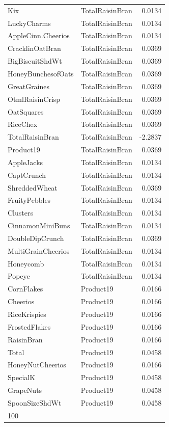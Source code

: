 \begin{longtable}{llr}
Kix & TotalRaisinBran & 0.0134 \\
LuckyCharms & TotalRaisinBran & 0.0134 \\
AppleCinn.Cheerios & TotalRaisinBran & 0.0134 \\
CracklinOatBran & TotalRaisinBran & 0.0369 \\
BigBiscuitShdWt & TotalRaisinBran & 0.0369 \\
HoneyBunchesofOats & TotalRaisinBran & 0.0369 \\
GreatGraines & TotalRaisinBran & 0.0369 \\
OtmlRaisinCrisp & TotalRaisinBran & 0.0369 \\
OatSquares & TotalRaisinBran & 0.0369 \\
RiceChex & TotalRaisinBran & 0.0369 \\
TotalRaisinBran & TotalRaisinBran & -2.2837 \\
Product19 & TotalRaisinBran & 0.0369 \\
AppleJacks & TotalRaisinBran & 0.0134 \\
CaptCrunch & TotalRaisinBran & 0.0134 \\
ShreddedWheat & TotalRaisinBran & 0.0369 \\
FruityPebbles & TotalRaisinBran & 0.0134 \\
Clusters & TotalRaisinBran & 0.0134 \\
CinnamonMiniBuns & TotalRaisinBran & 0.0134 \\
DoubleDipCrunch & TotalRaisinBran & 0.0369 \\
MultiGrainCheerios & TotalRaisinBran & 0.0134 \\
Honeycomb & TotalRaisinBran & 0.0134 \\
Popeye & TotalRaisinBran & 0.0134 \\
CornFlakes & Product19 & 0.0166 \\
Cheerios & Product19 & 0.0166 \\
RiceKrispies & Product19 & 0.0166 \\
FrostedFlakes & Product19 & 0.0166 \\
RaisinBran & Product19 & 0.0166 \\
Total & Product19 & 0.0458 \\
HoneyNutCheerios & Product19 & 0.0166 \\
SpecialK & Product19 & 0.0458 \\
GrapeNuts & Product19 & 0.0458 \\
SpoonSizeShdWt & Product19 & 0.0458 \\
100%

\end{longtable}
